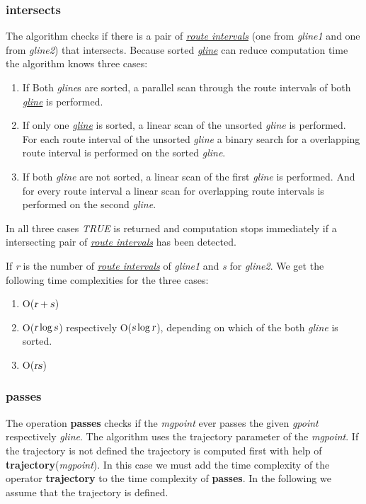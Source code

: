 \documentclass[a4paper]{article}
\newcommand{\op}[1]{\textbf{#1}}
\newcommand{\var}[1]{\textsl{#1}}
\newcommand{\dt}[1]{\textsl{\underline{#1}}}
\newcommand{\true}{\var{TRUE}}
\begin{document}
\subsubsection{\op{intersects}}
The algorithm checks if there is a pair of \dt{route intervals} (one from \var{gline1} and one from \var{gline2}) that intersects. Because sorted \dt{gline} can reduce computation time the algorithm knows three cases:
\begin{enumerate}
\item If Both \var{gline}s are sorted, a parallel scan through the route intervals of both \dt{gline} is performed.
\item If only one \dt{gline} is sorted, a linear scan of the unsorted \var{gline} is performed. For each route interval of the unsorted \var{gline} a binary search for a overlapping route interval is performed on the sorted \var{gline}.
\item If both \var{gline} are not sorted, a linear scan of the first \var{gline} is performed. And for every route interval a linear scan for overlapping route intervals is performed on the second \var{gline}.
\end{enumerate}
In all three cases \true{} is returned and computation stops immediately if a intersecting pair of \dt{route intervals} has been detected.

If \var{r} is the number of \dt{route intervals} of \var{gline1} and \var{s} for \var{gline2}. We get the following time complexities for the three cases:
\begin{enumerate}
\item O($\var{r}+\var{s}$)
\item O($\var{r} \log \var{s}$) respectively O($\var{s} \log \var{r}$), depending on which of the both \var{gline} is sorted.
\item O($\var{rs}$)
\end{enumerate}
\subsubsection{\op{passes}}
The operation \op{passes} checks if the \var{mgpoint} ever passes the given \var{gpoint} respectively \var{gline}. The algorithm uses the trajectory parameter of the \var{mgpoint}. If the trajectory is not defined the trajectory is computed first with help of \op{trajectory}(\var{mgpoint}). In this case we must add the time complexity of the operator \op{trajectory} to the time complexity of \op{passes}. In the following we assume that the trajectory is defined.
\end{document}
